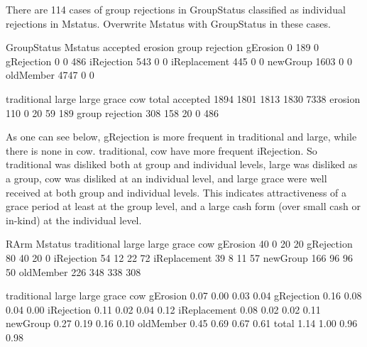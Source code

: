 


There are 114 cases of group rejections in \textsf{GroupStatus} classified as individual rejections in \textsf{Mstatus}. Overwrite \textsf{Mstatus} with \textsf{GroupStatus} in these cases.
\begin{Schunk}
\begin{Soutput}
              GroupStatus
Mstatus        accepted erosion group rejection
  gErosion            0     189               0
  gRejection          0       0             486
  iRejection        543       0               0
  iReplacement      445       0               0
  newGroup         1603       0               0
  oldMember        4747       0               0
\end{Soutput}
\begin{Soutput}
                traditional large large grace  cow total
accepted               1894  1801        1813 1830  7338
erosion                 110     0          20   59   189
group rejection         308   158          20    0   486
\end{Soutput}
\end{Schunk}
As one can see below, \textsf{gRejection} is more frequent in \textsf{traditional} and \textsf{large}, while there is none in \textsf{cow}. \textsf{traditional, cow} have more frequent \textsf{iRejection}. So \textsf{traditional} was disliked both at group and individual levels, \textsf{large} was disliked as a group, \textsf{cow} was disliked at an individual level, and \textsf{large grace} were well received at both group and individual levels. This indicates attractiveness of a grace period at least at the group level, and a large cash form (over small cash or in-kind) at the individual level.
\begin{Schunk}
\begin{Soutput}
              RArm
Mstatus        traditional large large grace cow
  gErosion              40     0          20  20
  gRejection            80    40          20   0
  iRejection            54    12          22  72
  iReplacement          39     8          11  57
  newGroup             166    96          96  50
  oldMember            226   348         338 308
\end{Soutput}
\end{Schunk}
\begin{Schunk}
\begin{Soutput}
             traditional large large grace  cow
gErosion            0.07  0.00        0.03 0.04
gRejection          0.16  0.08        0.04 0.00
iRejection          0.11  0.02        0.04 0.12
iReplacement        0.08  0.02        0.02 0.11
newGroup            0.27  0.19        0.16 0.10
oldMember           0.45  0.69        0.67 0.61
total               1.14  1.00        0.96 0.98
\end{Soutput}
\end{Schunk}

